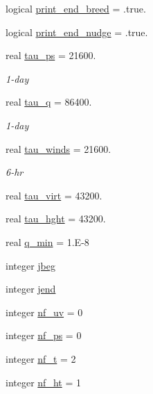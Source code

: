 \begin{DoxyCompactItemize}
\item 
logical \hyperlink{classfv__nwp__nudge__mod_a147187160ea12ff1251fc7e8ddb8b045}{print\-\_\-end\-\_\-breed} = .true.
\item 
logical \hyperlink{classfv__nwp__nudge__mod_a3068ea3b555378d00dbbd1f98a982f03}{print\-\_\-end\-\_\-nudge} = .true.
\item 
real \hyperlink{classfv__nwp__nudge__mod_a351915ecd86a6b30a9cc359a9d83ec59}{tau\-\_\-ps} = 21600.
\begin{DoxyCompactList}\small\item\em 1-\/day \end{DoxyCompactList}\item 
real \hyperlink{classfv__nwp__nudge__mod_a230458adc8e2b3649c9306bc76482b67}{tau\-\_\-q} = 86400.
\begin{DoxyCompactList}\small\item\em 1-\/day \end{DoxyCompactList}\item 
real \hyperlink{classfv__nwp__nudge__mod_a8a91872ad260e59a51cee29ec3729d5f}{tau\-\_\-winds} = 21600.
\begin{DoxyCompactList}\small\item\em 6-\/hr \end{DoxyCompactList}\item 
real \hyperlink{classfv__nwp__nudge__mod_a71192e4362d0448b7efb038493f8630b}{tau\-\_\-virt} = 43200.
\item 
real \hyperlink{classfv__nwp__nudge__mod_af7bc681ffc01fee847582a895acc391f}{tau\-\_\-hght} = 43200.
\item 
real \hyperlink{classfv__nwp__nudge__mod_a6132d02b32cd548905fb9ce035177937}{q\-\_\-min} = 1.E-\/8
\item 
integer \hyperlink{classfv__nwp__nudge__mod_a70bc4acdd2e6d0dfffe5632d08ce50af}{jbeg}
\item 
integer \hyperlink{classfv__nwp__nudge__mod_aefbee267032d4df68a60b6e8cab3018b}{jend}
\item 
integer \hyperlink{classfv__nwp__nudge__mod_ab0860b10bf5b0b892942089db400c304}{nf\-\_\-uv} = 0
\item 
integer \hyperlink{classfv__nwp__nudge__mod_a3482c6b80161fc5cbb0464c8ce29a44b}{nf\-\_\-ps} = 0
\item 
integer \hyperlink{classfv__nwp__nudge__mod_a1f356635df8d44472638c30747dccf70}{nf\-\_\-t} = 2
\item 
integer \hyperlink{classfv__nwp__nudge__mod_af093b08be6222c05893da2a51a656d68}{nf\-\_\-ht} = 1
\item 

\end{DoxyCompactItemize}
